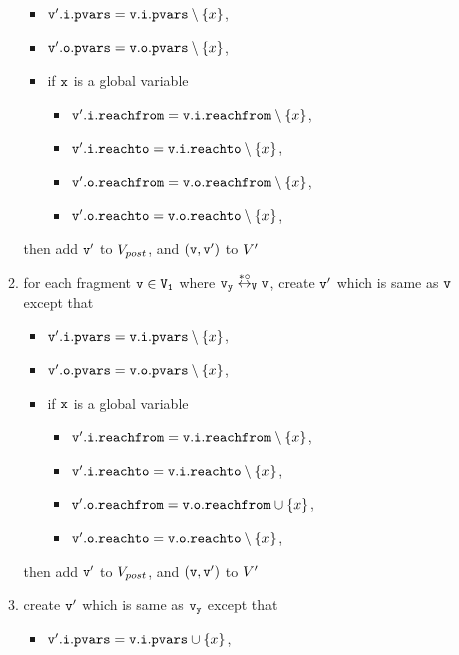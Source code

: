 \begin{itemize}
\begin{enumerate}
\begin{itemize}
\item $\mathtt{v}'.\mathtt{i}.\mathtt{pvars} = \mathtt{v}.\mathtt{i}.\mathtt{pvars} \setminus \left\{x\right\}$,
\item $\mathtt{v}'.\mathtt{o}.\mathtt{pvars} = \mathtt{v}.\mathtt{o}.\mathtt{pvars} \setminus \left\{x\right\}$,
\item if $\mathtt{x}$ is a global variable
\begin{itemize}
\item $\mathtt{v}'.\mathtt{i}.\mathtt{reachfrom} = \mathtt{v}.\mathtt{i}.\mathtt{reachfrom} \setminus \left\{x\right\}$,
\item $\mathtt{v}'.\mathtt{i}.\mathtt{reachto} = \mathtt{v}.\mathtt{i}.\mathtt{reachto} \setminus \left\{x\right\}$,
\item $\mathtt{v}'.\mathtt{o}.\mathtt{reachfrom} = \mathtt{v}.\mathtt{o}.\mathtt{reachfrom} \setminus \left\{x\right\}$,
\item $\mathtt{v}'.\mathtt{o}.\mathtt{reachto} = \mathtt{v}.\mathtt{o}.\mathtt{reachto} \setminus \left\{x\right\}$,
\end{itemize}
\end{itemize}
then add $\tt v'$ to $V_{post}$, and $\tt (v,v')$ to $V'$
\item for each fragment $\tt v \in V_1$ where $\tt \mathtt{v}_y \overset{*\circ}\leftrightarrow_{V} v$, create $\tt v'$ which is same as $\tt v$ except that
\begin{itemize}
\item $\mathtt{v}'.\mathtt{i}.\mathtt{pvars} = \mathtt{v}.\mathtt{i}.\mathtt{pvars} \setminus \left\{x\right\}$,
\item $\mathtt{v}'.\mathtt{o}.\mathtt{pvars} = \mathtt{v}.\mathtt{o}.\mathtt{pvars} \setminus \left\{x\right\}$,
\item if $\mathtt{x}$ is a global variable
\begin{itemize}
\item $\mathtt{v}'.\mathtt{i}.\mathtt{reachfrom} = \mathtt{v}.\mathtt{i}.\mathtt{reachfrom} \setminus \left\{x\right\}$,
\item $\mathtt{v}'.\mathtt{i}.\mathtt{reachto} = \mathtt{v}.\mathtt{i}.\mathtt{reachto} \setminus \left\{x\right\}$,
\item $\mathtt{v}'.\mathtt{o}.\mathtt{reachfrom} = \mathtt{v}.\mathtt{o}.\mathtt{reachfrom} \cup \left\{x\right\}$,
\item $\mathtt{v}'.\mathtt{o}.\mathtt{reachto} = \mathtt{v}.\mathtt{o}.\mathtt{reachto} \setminus \left\{x\right\}$,
\end{itemize}
\end{itemize}
then add $\tt v'$ to $V_{post}$, and $\tt (v,v')$ to $V'$
\item create $\tt v'$ which is same as $\tt \mathtt{v}_y$ except that
\begin{itemize}
\item $\mathtt{v}'.\mathtt{i}.\mathtt{pvars} = \mathtt{v}.\mathtt{i}.\mathtt{pvars} \cup \left\{x\right\}$,

\end{itemize}
\end{enumerate}
\end{itemize}
